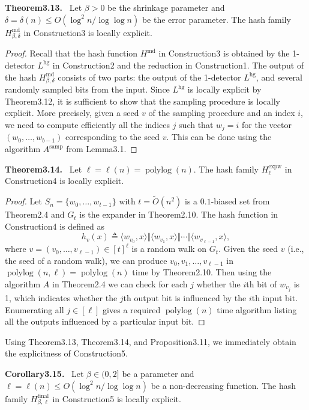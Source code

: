 \documentclass[10pt,a4paper]{article}
\newenvironment{authorclaim}[1]{\par\medskip\noindent\textbf{#1.}\ }{\par\medskip}
\begin{document}
\begin{authorclaim}{Theorem3.13}
Let $\beta>0$ be the shrinkage parameter and $\delta=\delta(n)\le O(\log^2n/\log\log n)$ be the error parameter. The hash family $H^{\mathrm{md}}_{\beta,\delta}$ in Construction3 is locally explicit.
\end{authorclaim}
\begin{proof}
Recall that the hash function $H^{\mathrm{md}}$ in Construction3 is obtained by the 1-detector $L^{\mathrm{hg}}$ in Construction2 and the reduction in Construction1. The output of the hash $H^{\mathrm{md}}_{\beta,\delta}$ consists of two parts: the output of the 1-detector $L^{\mathrm{hg}}$, and several randomly sampled bits from the input. Since $L^{\mathrm{hg}}$ is locally explicit by Theorem3.12, it is sufficient to show that the sampling procedure is locally explicit. More precisely, given a seed $v$ of the sampling procedure and an index $i$, we need to compute efficiently all the indices $j$ such that $w_j=i$ for the vector $(w_0,\ldots,w_{b-1})$ corresponding to the seed $v$. This can be done using the algorithm $A^{\mathrm{samp}}$ from Lemma3.1.
\end{proof}
\begin{authorclaim}{Theorem3.14}
Let $\ell=\ell(n)=\operatorname{polylog}(n)$. The hash family $H^{\mathrm{expw}}_\ell$ in Construction4 is locally explicit.
\end{authorclaim}
\begin{proof}
Let $S_n=\{w_0,\ldots,w_{t-1}\}$ with $t=\widetilde O(n^2)$ is a $0.1$-biased set from Theorem2.4 and $G_t$ is the expander in Theorem2.10. The hash function in Construction4 is defined as
\[h_v(x)\triangleq\langle w_{v_0},x\rangle\Vert\langle w_{v_1},x\rangle\Vert\cdots\Vert\langle w_{v_{\ell-1}},x\rangle,\]
where $v=(v_0,\ldots,v_{\ell-1})\in[t]^\ell$ is a random walk on $G_t$. Given the seed $v$ (i.e., the seed of a random walk), we can produce $v_0,v_1,\ldots,v_{\ell-1}$ in $\operatorname{polylog}(n,\ell)=\operatorname{polylog}(n)$ time by Theorem2.10. Then using the algorithm $A$ in Theorem2.4 we can check for each $j$ whether the $i$th bit of $w_{v_j}$ is 1, which indicates whether the $j$th output bit is influenced by the $i$th input bit. Enumerating all $j\in[\ell]$ gives a required $\operatorname{polylog}(n)$ time algorithm listing all the outputs influenced by a particular input bit.
\end{proof}
Using Theorem3.13, Theorem3.14, and Proposition3.11, we immediately obtain the explicitness of Construction5.
\begin{authorclaim}{Corollary3.15}
Let $\beta\in(0,2]$ be a parameter and $\ell=\ell(n)\le O(\log^2n/\log\log n)$ be a non-decreasing function. The hash family $H^{\mathrm{final}}_{\beta,\ell}$ in Construction5 is locally explicit.
\end{authorclaim}
\end{document}
